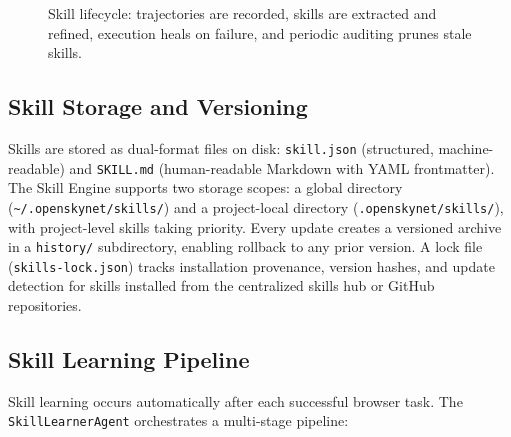 \begin{figure}[t]
    \caption{Skill lifecycle: trajectories are recorded, skills are extracted and refined, execution heals on failure, and periodic auditing prunes stale skills.}
    \label{fig:skill_lifecycle}
\end{figure}

\subsection{Skill Storage and Versioning}

Skills are stored as dual-format files on disk: \texttt{skill.json} (structured, machine-readable) and \texttt{SKILL.md} (human-readable Markdown with YAML frontmatter). The Skill Engine supports two storage scopes: a global directory (\texttt{\textasciitilde/.openskynet/skills/}) and a project-local directory (\texttt{.openskynet/skills/}), with project-level skills taking priority. Every update creates a versioned archive in a \texttt{history/} subdirectory, enabling rollback to any prior version. A lock file (\texttt{skills-lock.json}) tracks installation provenance, version hashes, and update detection for skills installed from the centralized skills hub or GitHub repositories.

\subsection{Skill Learning Pipeline}

Skill learning occurs automatically after each successful browser task. The \texttt{SkillLearnerAgent} orchestrates a multi-stage pipeline:

